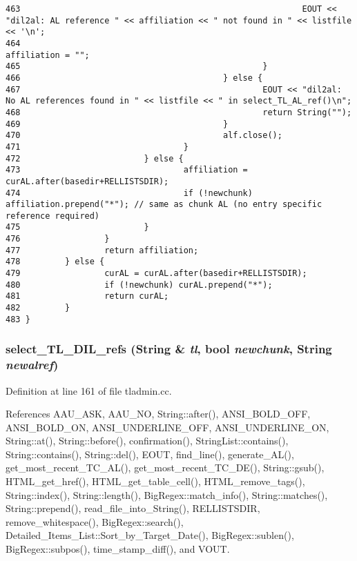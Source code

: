 \begin{verbatim}
463                                                         EOUT << "dil2al: AL reference " << affiliation << " not found in " << listfile << '\n';
464                                                         affiliation = "";
465                                                 }
466                                         } else {
467                                                 EOUT << "dil2al: No AL references found in " << listfile << " in select_TL_AL_ref()\n";
468                                                 return String("");
469                                         }
470                                         alf.close();
471                                 }
472                         } else {
473                                 affiliation = curAL.after(basedir+RELLISTSDIR);
474                                 if (!newchunk) affiliation.prepend("*"); // same as chunk AL (no entry specific reference required)
475                         }
476                 }
477                 return affiliation;
478         } else {
479                 curAL = curAL.after(basedir+RELLISTSDIR);
480                 if (!newchunk) curAL.prepend("*");
481                 return curAL;
482         }
483 }
\end{verbatim}\normalsize 
{}
\subsubsection{ select\_\-TL\_\-DIL\_\-refs ({\bf String} \& {\em tl}, bool {\em newchunk}, {\bf String} {\em newalref})}\label{tladmin_8cc_a7}




Definition at line 161 of file tladmin.cc.

References AAU\_\-ASK, AAU\_\-NO, String::after(), ANSI\_\-BOLD\_\-OFF, ANSI\_\-BOLD\_\-ON, ANSI\_\-UNDERLINE\_\-OFF, ANSI\_\-UNDERLINE\_\-ON, String::at(), String::before(), confirmation(), String\-List::contains(), String::contains(), String::del(), EOUT, find\_\-line(), generate\_\-AL(), get\_\-most\_\-recent\_\-TC\_\-AL(), get\_\-most\_\-recent\_\-TC\_\-DE(), String::gsub(), HTML\_\-get\_\-href(), HTML\_\-get\_\-table\_\-cell(), HTML\_\-remove\_\-tags(), String::index(), String::length(), Big\-Regex::match\_\-info(), String::matches(), String::prepend(), read\_\-file\_\-into\_\-String(), RELLISTSDIR, remove\_\-whitespace(), Big\-Regex::search(), Detailed\_\-Items\_\-List::Sort\_\-by\_\-Target\_\-Date(), Big\-Regex::sublen(), Big\-Regex::subpos(), time\_\-stamp\_\-diff(), and VOUT.

